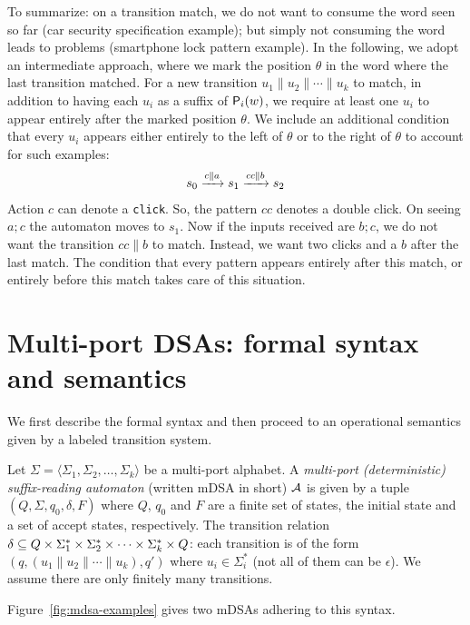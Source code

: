  To summarize: on a transition match, we do not want to consume the word seen so far (car security specification example); but simply not consuming the word leads to problems (smartphone lock pattern example). In the following, we adopt an intermediate approach, where we mark the position $\theta$ in the word where the last transition matched. For a new transition $u_1 \parallel u_2 \parallel \cdots \parallel u_k$ to match, in addition to having each $u_i$ as a suffix of $\mathsf{P}_{i}(w)$, we require at least one $u_i$ to appear entirely after the marked position $\theta$. We include an additional condition that every $u_i$ appears either entirely to the left of $\theta$ or to the right of $\theta$ to account for such examples: 
 \begin{align*}
  s_0 \xrightarrow{c \parallel a} s_1 \xrightarrow{cc \parallel b}s_2
 \end{align*}
 Action $c$ can denote a \texttt{click}. So, the pattern $cc$ denotes a double click. On seeing $a; c$ the automaton moves to $s_1$. Now if the inputs received are $b; c$, we do not want the transition $cc \parallel b$ to match. Instead, we want two clicks and a $b$ after the last match. The condition that every pattern appears entirely after this match, or entirely before this match takes care of this situation.
 




\section{Multi-port DSAs: formal syntax and semantics} 
\label{sec:mdsa-syntax-semantics}
We first describe the formal syntax and then proceed to an operational semantics given by a labeled transition system.

\begin{definition} Let
  $\Sigma = \langle \Sigma_1, \Sigma_2, \dots, \Sigma_k \rangle$ be a
  multi-port alphabet. A \emph{multi-port (deterministic)
    suffix-reading automaton} (written mDSA in short) $\mathcal{A}$ is given by a
  tuple $(Q, \Sigma, q_0, \delta, F)$ where $Q$, $q_0$ and
  $F$ are a finite set of states, the initial state and a set of
  accept states, respectively. %
  The transition relation
  $\delta \subseteq Q \times \Sigma_1^* \times \Sigma_2^* \times \cdots
  \times \Sigma_k^* \times Q$: each transition is of the form
  $(q, (u_1 \parallel u_2 \parallel \cdots \parallel u_k), q')$ where
  $u_i \in \Sigma_i^*$ (not all of them can be $\epsilon$). 
  We assume there are only finitely many transitions. 
 \end{definition}%
Figure~\ref{fig:mdsa-examples} gives two mDSAs adhering to this syntax. 

